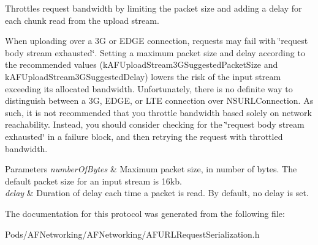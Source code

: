 Throttles request bandwidth by limiting the packet size and adding a delay for each chunk read from the upload stream.

When uploading over a 3G or E\+D\+GE connection, requests may fail with \char`\"{}request body stream exhausted\char`\"{}. Setting a maximum packet size and delay according to the recommended values ({\ttfamily k\+A\+F\+Upload\+Stream3\+G\+Suggested\+Packet\+Size} and {\ttfamily k\+A\+F\+Upload\+Stream3\+G\+Suggested\+Delay}) lowers the risk of the input stream exceeding its allocated bandwidth. Unfortunately, there is no definite way to distinguish between a 3G, E\+D\+GE, or L\+TE connection over {\ttfamily N\+S\+U\+R\+L\+Connection}. As such, it is not recommended that you throttle bandwidth based solely on network reachability. Instead, you should consider checking for the \char`\"{}request body stream exhausted\char`\"{} in a failure block, and then retrying the request with throttled bandwidth.


\begin{DoxyParams}{Parameters}
{\em number\+Of\+Bytes} & Maximum packet size, in number of bytes. The default packet size for an input stream is 16kb. \\
\hline
{\em delay} & Duration of delay each time a packet is read. By default, no delay is set. \\
\hline
\end{DoxyParams}


The documentation for this protocol was generated from the following file\+:\begin{DoxyCompactItemize}
\item 
Pods/\+A\+F\+Networking/\+A\+F\+Networking/A\+F\+U\+R\+L\+Request\+Serialization.\+h\end{DoxyCompactItemize}
